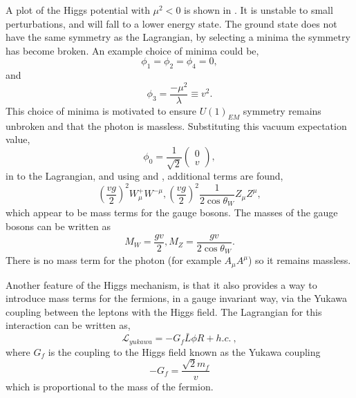 A plot of the Higgs potential with $\mu^{2}<0$ is shown in
. It is unstable to small perturbations, and will fall
to a lower energy state. 
The ground state does not have the same symmetry as the Lagrangian, by
selecting a minima the symmetry has become broken. An example choice of minima
could be,
\begin{equation}
\phi_{1} = \phi_{2} = \phi_{4} = 0,
\end{equation}
and
\begin{equation}
\phi_{3} = \frac{-\mu^{2}}{\lambda} \equiv v^{2}.
\end{equation}
This choice of minima is motivated to ensure $U(1)_{EM}$ symmetry remains
unbroken and
that the photon is massless.
Substituting this vacuum expectation value,
\begin{equation}
\phi_{0} = \frac{1}{\sqrt{2}}\left(\begin{matrix}0\\v\end{matrix}\right),
\end{equation}
in to the Lagrangian, and using  and
, additional terms are found\cite{},
\begin{equation}
\left(\frac{vg}{2}\right)^{2} W^{+}_{\mu} W^{- \mu}, 
\left(\frac{vg}{2}\right)^{2} \frac{1}{2\cos\theta_{W}} Z_{\mu} Z^{\mu},
\end{equation}
which appear to be mass terms for the gauge bosons.
The masses of the gauge bosons can be written as 
\begin{equation}
M_{W} = \frac{gv}{2}, 
M_{Z} = \frac{gv}{2\cos\theta_{W}}.
\end{equation}
There is no mass term for the photon (for example $A_{\mu}A^{\mu}$) so it
remains massless.

Another feature of the Higgs mechanism, is that it also provides a way to
introduce mass terms for the fermions, in a gauge invariant way, via the Yukawa
coupling between the leptons with the Higgs field. The Lagrangian for this
interaction can be written as, 
\begin{equation}
\mathcal{L}_{yukawa} = -G_{f}\bar{L}\phi R + h.c. \ ,
\end{equation}
where $G_{f}$ is the coupling to the Higgs field known as the Yukawa coupling
\begin{equation}
-G_{f} = \frac{\sqrt{2}m_{f}}{v}
\end{equation}
which is proportional to the mass of the fermion. 

